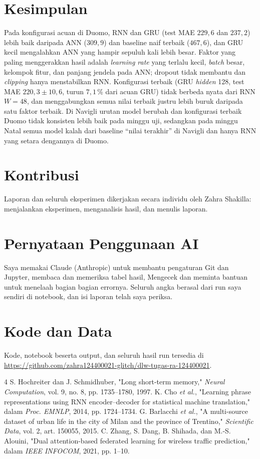 \documentclass[conference,a4paper]{IEEEtran}
\begin{document}
\section{Kesimpulan}
Pada konfigurasi acuan di Duomo, RNN dan GRU (test MAE $229{,}6$ dan $237{,}2$) lebih baik daripada ANN ($309{,}9$) dan baseline naif terbaik ($467{,}6$), dan GRU kecil mengalahkan ANN yang hampir sepuluh kali lebih besar. Faktor yang paling menggerakkan hasil adalah \textit{learning rate} yang terlalu kecil, \textit{batch} besar, kelompok fitur, dan panjang jendela pada ANN; dropout tidak membantu dan \textit{clipping} hanya menstabilkan RNN. Konfigurasi terbaik (GRU \textit{hidden} 128, test MAE $220{,}3 \pm 10{,}6$, turun $7{,}1$\,\% dari acuan GRU) tidak berbeda nyata dari RNN $W=48$, dan menggabungkan semua nilai terbaik justru lebih buruk daripada satu faktor terbaik. Di Navigli urutan model berubah dan konfigurasi terbaik Duomo tidak konsisten lebih baik pada minggu uji, sedangkan pada minggu Natal semua model kalah dari baseline ``nilai terakhir'' di Navigli dan hanya RNN yang setara dengannya di Duomo.

\section*{Kontribusi}
Laporan dan seluruh eksperimen dikerjakan secara individu oleh Zahra Shakilla: menjalankan eksperimen, menganalisis hasil, dan menulis laporan.

\section*{Pernyataan Penggunaan AI}
Saya memakai Claude (Anthropic) untuk membantu pengaturan Git dan Jupyter, membaca dan memeriksa tabel hasil, Mengecek dan meminta bantuan untuk menelaah bagian bagian errornya. Seluruh angka berasal dari run saya sendiri di notebook, dan isi laporan telah saya periksa. 
\section*{Kode dan Data}
Kode, notebook beserta output, dan seluruh hasil run tersedia di \url{https://github.com/zahra124400021-glitch/dlw-tugas-ra-124400021}.

\begin{thebibliography}{4}
 S. Hochreiter dan J. Schmidhuber, "Long short-term memory," \textit{Neural Computation}, vol. 9, no. 8, pp. 1735--1780, 1997.
 K. Cho \textit{et al.}, "Learning phrase representations using RNN encoder--decoder for statistical machine translation," dalam \textit{Proc. EMNLP}, 2014, pp. 1724--1734.
 G. Barlacchi \textit{et al.}, "A multi-source dataset of urban life in the city of Milan and the province of Trentino," \textit{Scientific Data}, vol. 2, art. 150055, 2015.
 C. Zhang, S. Dang, B. Shihada, dan M.-S. Alouini, "Dual attention-based federated learning for wireless traffic prediction," dalam \textit{IEEE INFOCOM}, 2021, pp. 1--10.
\end{thebibliography}
\end{document}
